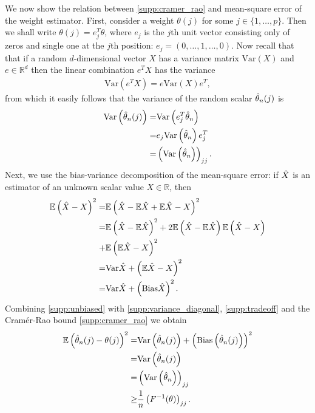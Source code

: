 We now show the relation between \eqref{supp:cramer_rao} and mean-square error of the weight estimator. First, consider a weight $\theta(j)$ for some $j\in\lbrace 1,\dots, p\rbrace$. Then we shall write $\theta(j)=e_j^T\theta$, where $e_j$ is the $j$th unit vector consisting only of zeros and single one at the $j$th position: $e_j=(0,\dots,1,\dots, 0)$. Now recall that that if a random $d$-dimensional vector $X$ has a variance matrix $\text{Var}\left( X\right)$ and $e\in\mathbb{R}^d$ then the linear combination $e^TX$ has the variance
\begin{align}
    \text{Var}\left(e^TX\right)=e\text{Var}\left( X\right)e^T,
\end{align}
from which it easily follows that the variance of the random scalar $\Hat{\theta}_n(j)$ is
\begin{align}
    \text{Var}\left( \Hat{\theta}_n(j)\right)=&\text{Var}\left( e_j^T\Hat{\theta}_n\right)\nonumber\\
    =&e_j\text{Var}\left( \Hat{\theta}_n\right)e_j^T\nonumber\\
    =&\left(\text{Var}\left( \Hat{\theta}_n\right)\right)_{jj}.
    \label{supp:variance_diagonal}
\end{align}
Next, we use the bias-variance decomposition of the mean-square error: if $\Hat{X}$ is an estimator of an unknown scalar value $X\in\mathbb{R}$, then
\begin{align}
    \mathbb{E}\left(\Hat{X}-X\right)^2=&\mathbb{E}\left(\Hat{X}-\mathbb{E}\Hat{X}+\mathbb{E}\Hat{X}-X\right)^2\nonumber\\
    =&\mathbb{E}\left(\Hat{X}-\mathbb{E}\Hat{X}\right)^2+2\mathbb{E}\left(\Hat{X}-\mathbb{E}\Hat{X}\right)\mathbb{E}\left(\Hat{X}-X\right)\nonumber\\
    +&\mathbb{E}\left(\mathbb{E}\Hat{X}-X\right)^2\nonumber\\
    =&\text{Var}\Hat{X}+\left(\mathbb{E}\Hat{X}-X\right)^2\nonumber\\
    =&\text{Var}\Hat{X}+\left(\text{Bias}\hat{X}\right)^2.
    \label{supp:tradeoff}
\end{align}
Combining \eqref{supp:unbiased} with \eqref{supp:variance_diagonal}, \eqref{supp:tradeoff} and the Cramér-Rao bound \eqref{supp:cramer_rao} we obtain
\begin{align}
    \mathbb{E}\left( \Hat{\theta}_n(j)-\theta(j)\right)^2=&\text{Var}\left({\Hat{\theta}_n(j)}\right)+\left(\text{Bias}\left(\Hat{\theta}_n(j)\right)\right)^2\nonumber\\
    =&\text{Var}\left({\Hat{\theta}_n(j)}\right)\nonumber\\
    =&\left(\text{Var}\left( \Hat{\theta}_n\right)\right)_{jj}\nonumber\\
    \geq&\frac{1}{n}\left(F^{-1}(\theta)\right)_{jj}.
\end{align}
